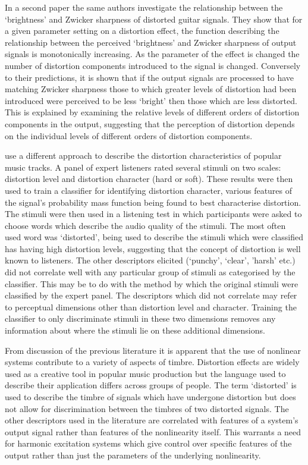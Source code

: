 	In a second paper \citep{tsumoto2016the} the same authors investigate the relationship between the `brightness' and
	Zwicker sharpness of distorted guitar signals. They show that for a given parameter setting on a distortion effect,
	the function describing the relationship between the perceived `brightness' and Zwicker sharpness of output signals
	is monotonically increasing. As the parameter of the effect is changed the number of distortion components
	introduced to the signal is changed. Conversely to their predictions, it is shown that if the output signals are
	processed to have matching Zwicker sharpness those to which greater levels of distortion had been introduced were
	perceived to be less `bright' then those which are less distorted. This is explained by examining the relative
	levels of different orders of distortion components in the output, suggesting that the perception of distortion
	depends on the individual levels of different orders of distortion components.

	\citet{wilson2014characterisation} use a different approach to describe the distortion characteristics of popular
	music tracks. A panel of expert listeners rated several stimuli on two scales: distortion level and distortion
	character (hard or soft). These results were then used to train a classifier for identifying distortion character,
	various features of the signal's probability mass function being found to best characterise distortion. The stimuli
	were then used in a listening test in which participants were asked to choose words which describe the audio
	quality of the stimuli. The most often used word was `distorted', being used to describe the stimuli which were
	classified has having high distortion levels, suggesting that the concept of distortion is well known to listeners.
	The other descriptors elicited (`punchy', `clear', 'harsh' etc.) did not correlate well with any particular group
	of stimuli as categorised by the classifier. This may be to do with the method by which the original stimuli were
	classified by the expert panel. The descriptors which did not correlate may refer to perceptual dimensions other
	than distortion level and character. Training the classifier to only discriminate stimuli in these two dimensions
	removes any information about where the stimuli lie on these additional dimensions.

	From discussion of the previous literature it is apparent that the use of nonlinear systems contribute to a variety
	of aspects of timbre. Distortion effects are widely used as a creative tool in popular music production but the
	language used to describe their application differs across groups of people. The term `distorted' is used to
	describe the timbre of signals which have undergone distortion but does not allow for discrimination between the
	timbres of two distorted signals. The other descriptors used in the literature are correlated with features of a
	system's output signal rather than features of the nonlinearity itself. This warrants a need for harmonic
	excitation systems which give control over specific features of the output rather than just the parameters of the
	underlying nonlinearity. 

